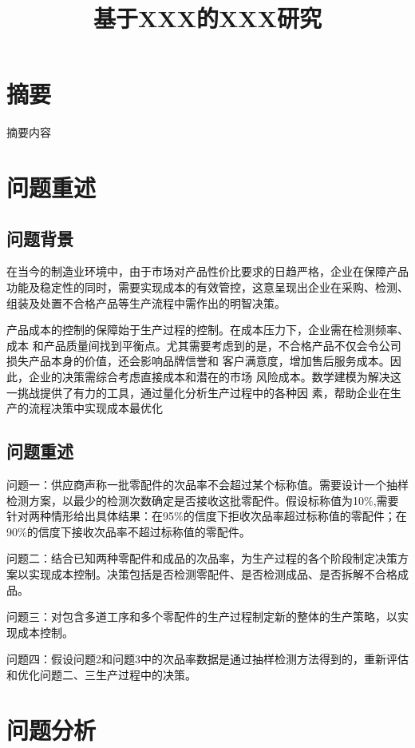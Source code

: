 \documentclass[withoutpreface,bwprint]{cumcmthesis}
\title{基于XXX的XXX研究}
\begin{document}
\maketitle


\section{摘要}
摘要内容

\section{问题重述}
\subsection{问题背景}
在当今的制造业环境中，由于市场对产品性价比要求的日趋严格，企业在保障产品功能及稳定性的同时，需要实现成本的有效管控，这意呈现出企业在采购、检测、组装及处置不合格产品等生产流程中需作出的明智决策。

产品成本的控制的保障始于生产过程的控制。在成本压力下，企业需在检测频率、成本
和产品质量间找到平衡点。尤其需要考虑到的是，不合格产品不仅会令公司损失产品本身的价值，还会影响品牌信誉和
客户满意度，增加售后服务成本。因此，企业的决策需综合考虑直接成本和潜在的市场
风险成本。数学建模为解决这一挑战提供了有力的工具，通过量化分析生产过程中的各种因
素，帮助企业在生产的流程决策中实现成本最优化

\subsection{问题重述}
问题一：供应商声称一批零配件的次品率不会超过某个标称值。需要设计一个抽样检测方案，以最少的检测次数确定是否接收这批零配件。假设标称值为10\%,需要针对两种情形给出具体结果：在95\%的信度下拒收次品率超过标称值的零配件；在90\%的信度下接收次品率不超过标称值的零配件。

问题二：结合已知两种零配件和成品的次品率，为生产过程的各个阶段制定决策方案以实现成本控制。决策包括是否检测零配件、是否检测成品、是否拆解不合格成品。

问题三：对包含多道工序和多个零配件的生产过程制定新的整体的生产策略，以实现成本控制。

问题四：假设问题2和问题3中的次品率数据是通过抽样检测方法得到的，重新评估和优化问题二、三生产过程中的决策。

\section{问题分析}
\end{document}

